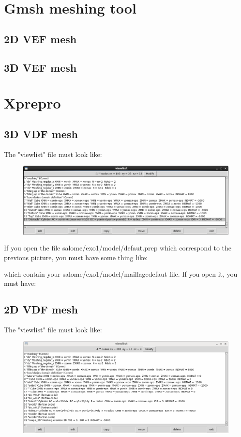 \documentclass[english]{article}
\begin{document}
\section{Gmsh meshing tool}
\subsection{2D VEF mesh}

\subsection{3D VEF mesh}



\section{Xprepro}

\subsection{3D VDF mesh}
The "viewlist" file must look like:
\begin{figure}[h]
\includegraphics[width=1.1\textwidth]{xprepro_exo1_default_prep.png}
\end{figure}

If you open the file salome/exo1/model/defaut.prep which correspond to the previous picture, you must have some thing like:


which contain your salome/exo1/model/maillagedefaut file. If you open it, you must have:


\newpage
\subsection{2D VDF mesh}
The "viewlist" file must look like:
\begin{figure}[h]
\includegraphics[width=1.1\textwidth]{xprepro_exo2_default_prep.png}
\end{figure}
\end{document}
